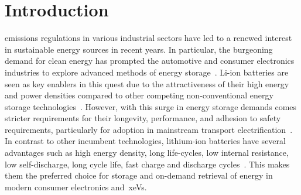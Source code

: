 
\graphicspath{{chapters/introduction/figures/}}
\clearpage
\chapter{Introduction}\label{ch:intro}
\startcontents[chapters]

\bigskip

 emissions  regulations in various  industrial sectors
have led  to a renewed interest  in sustainable energy sources  in recent years.
In  particular,  the  burgeoning  demand  for  clean  energy  has  prompted  the
automotive and  consumer electronics industries  to explore advanced  methods of
energy storage~\cite{Weiss2011}. Li-ion batteries are  seen  as  key enablers 
in this  quest due  to  the attractiveness  of their  high energy  and power 
densities compared  to  other competing  non-conventional energy  storage
technologies~\cite{Ibrahim2008}.  However, with this  surge  in energy  storage
demands  comes  stricter  requirements  for  their  longevity,  performance, 
and adhesion  to  safety  requirements,  particularly  for  adoption  in 
mainstream transport  electrification~\cite{Andrea2010}.  In  contrast to  other
incumbent technologies,  lithium-ion batteries  have several  advantages such 
as high  energy density,  long life-cycles,  low internal  resistance, low 
self-discharge, long cycle life,  fast charge  and discharge 
cycles~\cite{Reddy2011,Plett2015}. This makes them the preferred choice for
storage and on-demand retrieval of energy in modern consumer electronics
and~\glspl{xeV}.



